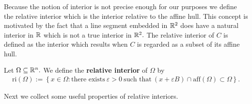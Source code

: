 Because the notion of interior is not precise enough for our purposes
we define the relative interior which is the interior relative to the affine hull.
This concept is motivated by the fact that a line segment embedded in $\mathbb{R}^2$
does have a natural interior in $\mathbb{R}$ which is not a true interior in $\mathbb{R}^2.$
The relative interior of $C$ is defined as the interior which results when
$C$ is regarded as a subset of its affine hull.
\begin{definition}
  Let 
  $\Omega\subseteq \mathbb{R}^n.$
  We define the \textbf{relative interior} of $\Omega$ by
  \begin{gather}
    \mathrm{ri}(\Omega)
    :=
    \left\{ 
      x \in \Omega 
      \colon
      \text{there exists}\ 
      \varepsilon > 0\ 
      \text{such that}\ 
      (
        x+\varepsilon B
      )
      \cap
      \mathrm{aff}(\Omega)
      \subset
      \Omega
    \right\}.
  \end{gather}
\end{definition}
Next we collect some useful properties of relative interiors.
